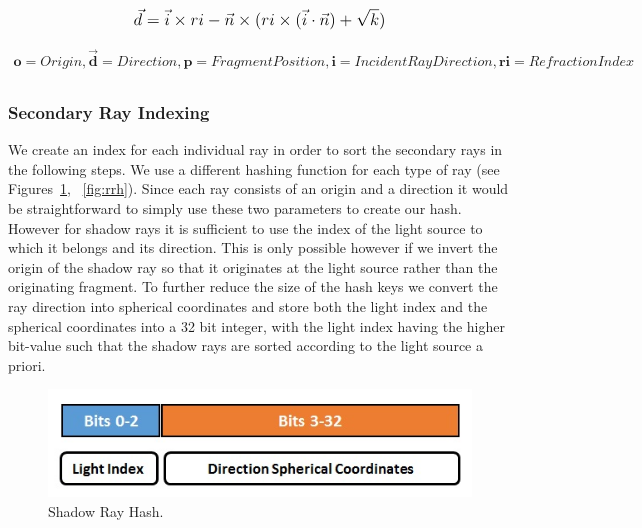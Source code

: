 \begin{equation}
    \mathlarger{\vec{d} = \vec{i} \times ri - \vec{n} \times (ri \times (\vec{i} \cdot \vec{n}) + \sqrt{k})}
\end{equation}  

\begin{align*}
    \textbf{o} = Origin, \mathbf{\vec{d}} = Direction,                     
    \textbf{p} = Fragment Position,
    \textbf{i} = Incident Ray Direction,
    \textbf{ri} = Refraction Index\\
\end{align*}
            

\subsubsection{Secondary Ray Indexing}

We create an index for each individual ray in order to sort the secondary rays in the following steps. We use a different hashing function for each type of ray (see Figures~\ref{fig:srh}, ~\ref{fig:rrh}). Since each ray consists of an origin and a direction it would be straightforward to simply use these two parameters to create our hash. However for shadow rays it is sufficient to use the index of the light source to which it belongs and its direction. This is only possible however if we invert the origin of the shadow ray so that it originates at the light source rather than the originating fragment. To further reduce the size of the hash keys we convert the ray direction into spherical coordinates \cite{GraphicGems5} and store both the light index and the spherical coordinates into a 32 bit integer, with the light index having the higher bit-value such that the shadow rays are sorted according to the light source a priori.

\medskip

\begin{figure}[!htb]
    \centering
    \includegraphics[scale=0.85]{Images/Shadow_Hash}
    \caption{\label{fig:srh}Shadow Ray Hash.}
\end{figure}

